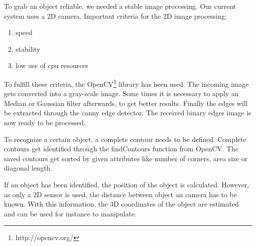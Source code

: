 To grab an object reliable, we needed a stable image processing. Our current system uses a 2D camera. Important criteria for the 2D image processing:


\begin{enumerate}
	\item speed
	\item stability
	\item low use of cpu resources
\end{enumerate}

To fulfill these criteria, the OpenCV\footnote{http://opencv.org/} library has been used. The incoming image gets converted into a gray-scale image. Some times it is necessary to apply an Median or Gaussian filter afterwards, to get better results. Finally the edges will be extracted through the canny edge detector. The received binary edges image is now ready to be processed.

To recognize a certain object, a complete contour needs to be defined. Complete contours get identified through the findContours function from OpenCV. The saved contours get sorted by given attributes like number of corners, area size or diagonal length.

If an object has been identified, the position of the object is calculated. However, as only a 2D sensor is used, the distance between object an camera has to be known. With this information, the 3D coordinates of the object are estimated and can be used for instance to manipulate.



